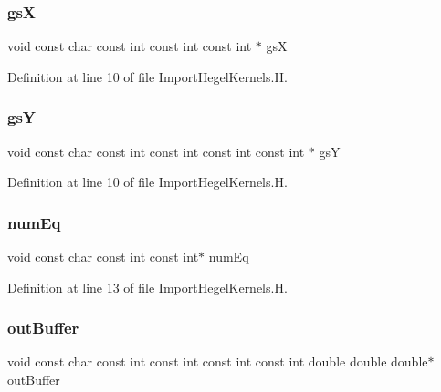 \subsubsection{\texorpdfstring{gsX}{gsX}}
{\footnotesize\ttfamily void const char const int const int const int $\ast$ gsX}



Definition at line 10 of file Import\+Hegel\+Kernels.\+H.

\hypertarget{ImportHegelKernels_8H_a45de1e939a5096b060dd1f010a69271b}{}\label{ImportHegelKernels_8H_a45de1e939a5096b060dd1f010a69271b} 
\subsubsection{\texorpdfstring{gsY}{gsY}}
{\footnotesize\ttfamily void const char const int const int const int const int $\ast$ gsY}



Definition at line 10 of file Import\+Hegel\+Kernels.\+H.

\hypertarget{ImportHegelKernels_8H_aded1b9ea65ac4416cb441082a0e7bfec}{}\label{ImportHegelKernels_8H_aded1b9ea65ac4416cb441082a0e7bfec} 
\subsubsection{\texorpdfstring{num\+Eq}{numEq}}
{\footnotesize\ttfamily void const char const int const int$\ast$ num\+Eq}



Definition at line 13 of file Import\+Hegel\+Kernels.\+H.

\hypertarget{ImportHegelKernels_8H_aa378675db886707686ce96c263b21c8d}{}\label{ImportHegelKernels_8H_aa378675db886707686ce96c263b21c8d} 
\subsubsection{\texorpdfstring{out\+Buffer}{outBuffer}}
{\footnotesize\ttfamily void const char const int const int const int const int double double double$\ast$ out\+Buffer}



